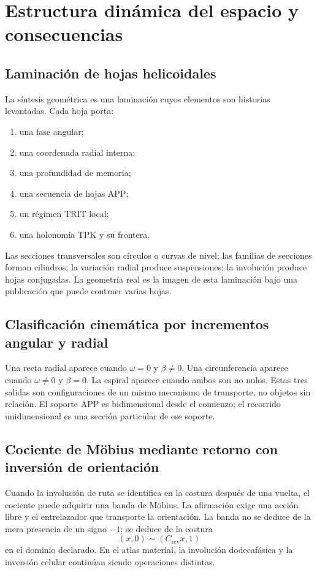 \chapter{Estructura dinámica del espacio y consecuencias}

\section{Laminación de hojas helicoidales}

La síntesis geométrica es una laminación cuyos elementos son historias
levantadas. Cada hoja porta:
\begin{enumerate}
\item una fase angular;
\item una coordenada radial interna;
\item una profundidad de memoria;
\item una secuencia de hojas APP;
\item un régimen TRIT local;
\item una holonomía TPK y su frontera.
\end{enumerate}
Las secciones transversales son círculos o curvas de nivel; las familias de
secciones forman cilindros; la variación radial produce suspensiones; la
involución produce hojas conjugadas. La geometría real es la imagen de esta
laminación bajo una publicación que puede contraer varias hojas.

\section{Clasificación cinemática por incrementos angular y radial}

Una recta radial aparece cuando \(\omega=0\) y \(\beta\neq0\). Una
circunferencia aparece cuando \(\omega\neq0\) y \(\beta=0\). La espiral
aparece cuando ambos son no nulos. Estas tres salidas son configuraciones de
un mismo mecanismo de transporte, no objetos sin relación. El soporte APP
es bidimensional desde el comienzo; el recorrido unidimensional es una
sección particular de ese soporte.

\section{Cociente de Möbius mediante retorno con inversión de orientación}

Cuando la involución de ruta se identifica en la costura después de una
vuelta, el cociente puede adquirir una banda de Möbius. La afirmación exige
una acción libre y el entrelazador que transporte la orientación. La banda no
se deduce de la mera presencia de un signo \(-1\); se deduce de la costura
\[
 (x,0)\sim(C_{\mathrm{rev}}x,1)
\]
en el dominio declarado. En el atlas material, la involución dodecafásica y
la inversión celular continúan siendo operaciones distintas.

